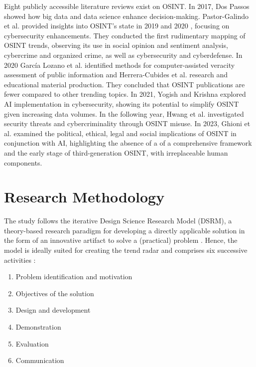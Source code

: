 \documentclass[10pt]{article}
\begin{document}
Eight publicly accessible literature reviews exist on OSINT. In 2017, Dos Passos \cite{DosPassos.2017} showed how big data and data science enhance decision-making. Pastor-Galindo et al.
provided insights into OSINT's state in 2019 and 2020 \cite{PastorGalindo.2019, PastorGalindo.2020}, focusing on cybersecurity
enhancements. They conducted the first rudimentary mapping of OSINT trends, observing its use in social opinion and sentiment
analysis, cybercrime and organized crime, as well as cybersecurity and cyberdefense. In 2020 García Lozano et al. \cite{GarciaLozano.2020}
identified methods for computer-assisted veracity assessment of public information and
Herrera-Cubides et al. \cite{HerreraCubides.2020} research and educational material production. They concluded that OSINT
publications are fewer compared to other trending topics. In 2021, Yogish and Krishna \cite{Yogish.2021} explored AI implementation in cybersecurity,
showing its potential to simplify OSINT given increasing data volumes. In the following year, Hwang et al.
\cite{Hwang.2022} investigated security threats and cybercriminality through OSINT misuse.
In 2023, Ghioni et al. \cite{Ghioni.2023} examined the political, ethical, legal and social implications of
OSINT in conjunction with AI, highlighting the absence of a of a comprehensive framework and the early stage of third-generation OSINT, with irreplaceable human components.

\section{Research Methodology}

The study follows the iterative Design Science Research Model (DSRM),
a theory-based research paradigm for developing a directly applicable solution in the form of an innovative artifact \cite{vomBrocke.2020b}
to solve a (practical) problem \cite{Peffers.2007}. Hence, the model is ideally suited for creating the trend radar and comprises
six successive activities \cite{Peffers.2007}:

\begin{enumerate}[itemsep=.5pt,parsep=1pt,topsep=1pt]
    \item Problem identification and motivation
    \item Objectives of the solution
    \item Design and development
    \item Demonstration
    \item Evaluation
    \item Communication
\end{enumerate}
\end{document}

